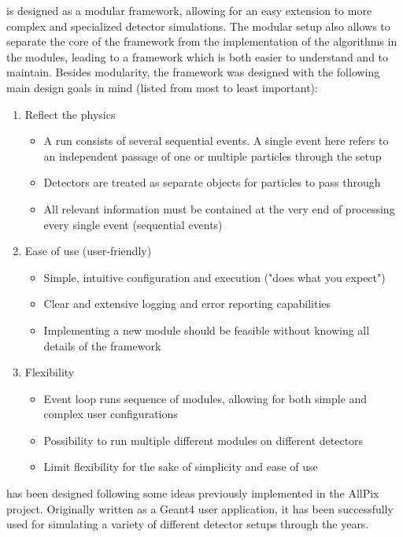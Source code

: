 \apsq is designed as a modular framework, allowing for an easy extension to more complex and specialized detector simulations.
The modular setup also allows to separate the core of the framework from the implementation of the algorithms in the modules, leading to a framework which is both easier to understand and to maintain.
Besides modularity, the \apsq framework was designed with the following main design goals in mind (listed from most to least important):
\begin{enumerate}
    \item Reflect the physics
    \begin{itemize}
        \item A run consists of several sequential events. A single event here refers to an independent passage of one or multiple particles through the setup
        \item Detectors are treated as separate objects for particles to pass through
        \item All relevant information must be contained at the very end of processing every single event (sequential events)
    \end{itemize}
    \item Ease of use (user-friendly)
    \begin{itemize}
        \item Simple, intuitive configuration and execution ("does what you expect")
        \item Clear and extensive logging and error reporting capabilities
        \item Implementing a new module should be feasible without knowing all details of the framework
    \end{itemize}
    \item Flexibility
    \begin{itemize}
        \item Event loop runs sequence of modules, allowing for both simple and complex user configurations
        \item Possibility to run multiple different modules on different detectors
        \item Limit flexibility for the sake of simplicity and ease of use
    \end{itemize}
\end{enumerate}

\apsq has been designed following some ideas previously implemented in the AllPix~\cite{ap1wiki,ap1git} project.
Originally written as a Geant4 user application, it has been successfully used for simulating a variety of different detector setups through the years.

